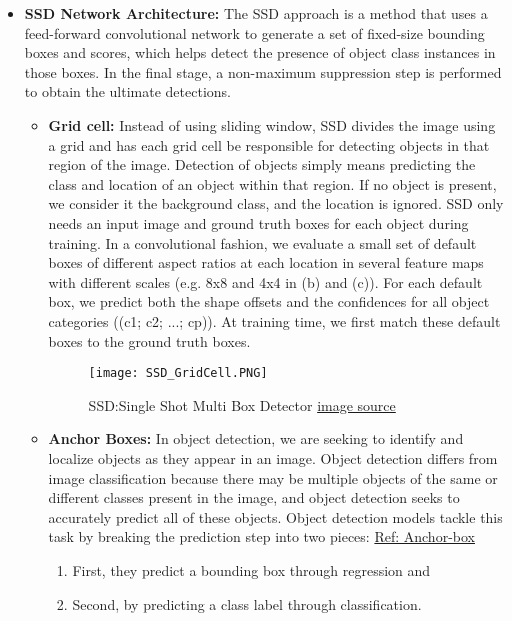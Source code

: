 \begin{itemize}
    \item \textbf{SSD Network Architecture: } The SSD approach is a method that uses a feed-forward convolutional network to generate a set of fixed-size bounding boxes and scores, which helps detect the presence of object class instances in those boxes. In the final stage, a non-maximum suppression step is performed to obtain the ultimate detections. \\
    \begin{itemize}
        \item \textbf{Grid cell: } Instead of using sliding window, SSD divides the image using a grid and has each grid cell be responsible for detecting objects in that region of the image. Detection of objects simply means predicting the class and location of an object within that region. If no object is present, we consider it the background class, and the location is ignored. 
        SSD only needs an input image and ground truth boxes for each object during training.
        In a convolutional fashion, we evaluate a small set
        of default boxes of different aspect ratios at each location in several feature maps with
        different scales (e.g. 8x8 and 4x4 in (b) and (c)). For each default box, we predict
        both the shape offsets and the confidences for all object categories ((c1; c2; ...; cp)).
        At training time, we first match these default boxes to the ground truth boxes.
        \begin{figure}[H]
            \centering
            \texttt{[image: SSD\_GridCell.PNG]}
            \caption{SSD:Single Shot Multi Box Detector \textcolor{red}{\protect\href{https://arxiv.org/pdf/1512.02325.pdf}{image source}}}
            \label{fig:SSD_grid}
        \end{figure}
        
        \item \textbf{Anchor Boxes:} In object detection, we are seeking to identify and localize objects as they appear in an image. Object detection differs from image classification because there may be multiple objects of the same or different classes present in the image, and object detection seeks to accurately predict all of these objects.
        Object detection models tackle this task by breaking the prediction step into two pieces: 
        \textcolor{red}{\href{https://blog.roboflow.com/what-is-an-anchor-box/}{Ref: Anchor-box}}
        \begin{enumerate}
            \item First, they predict a bounding box through regression and
            \item Second, by predicting a class label through classification.
        \end{enumerate}
        

\end{itemize}
\end{itemize}
